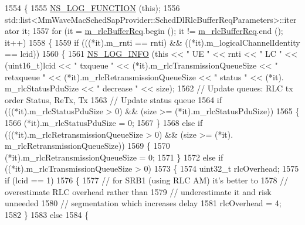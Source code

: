\begin{DoxyCode}
1554 \{
1555   \hyperlink{log-macros-disabled_8h_a90b90d5bad1f39cb1b64923ea94c0761}{NS\_LOG\_FUNCTION} (\textcolor{keyword}{this});
1556   std::list<MmWaveMacSchedSapProvider::SchedDlRlcBufferReqParameters>::iterator it;
1557   \textcolor{keywordflow}{for} (it = \hyperlink{classns3_1_1MmWaveFlexTtiMaxWeightMacScheduler_ad93ce7bf5f3377a1cfa4bc54b7e7b551}{m\_rlcBufferReq}.begin (); it != \hyperlink{classns3_1_1MmWaveFlexTtiMaxWeightMacScheduler_ad93ce7bf5f3377a1cfa4bc54b7e7b551}{m\_rlcBufferReq}.end (); it++)
1558     \{
1559       \textcolor{keywordflow}{if} (((*it).m\_rnti == rnti) && ((*it).m\_logicalChannelIdentity == lcid))
1560         \{
1561           \hyperlink{group__logging_gafbd73ee2cf9f26b319f49086d8e860fb}{NS\_LOG\_INFO} (\textcolor{keyword}{this} << \textcolor{stringliteral}{" UE "} << rnti << \textcolor{stringliteral}{" LC "} << (uint16\_t)lcid << \textcolor{stringliteral}{" txqueue "} << 
      (*it).m\_rlcTransmissionQueueSize << \textcolor{stringliteral}{" retxqueue "} << (*it).m\_rlcRetransmissionQueueSize << \textcolor{stringliteral}{" status "} << (*it).
      m\_rlcStatusPduSize << \textcolor{stringliteral}{" decrease "} << size);
1562           \textcolor{comment}{// Update queues: RLC tx order Status, ReTx, Tx}
1563           \textcolor{comment}{// Update status queue}
1564            \textcolor{keywordflow}{if} (((*it).m\_rlcStatusPduSize > 0) && (size >= (*it).m\_rlcStatusPduSize))
1565               \{
1566                 (*it).m\_rlcStatusPduSize = 0;
1567               \}
1568             \textcolor{keywordflow}{else} \textcolor{keywordflow}{if} (((*it).m\_rlcRetransmissionQueueSize > 0) && (size >= (*it).
      m\_rlcRetransmissionQueueSize))
1569               \{
1570                 (*it).m\_rlcRetransmissionQueueSize = 0;
1571               \}
1572             \textcolor{keywordflow}{else} \textcolor{keywordflow}{if} ((*it).m\_rlcTransmissionQueueSize > 0)
1573               \{
1574                 uint32\_t rlcOverhead;
1575                 \textcolor{keywordflow}{if} (lcid == 1)
1576                   \{
1577                     \textcolor{comment}{// for SRB1 (using RLC AM) it's better to}
1578                     \textcolor{comment}{// overestimate RLC overhead rather than}
1579                     \textcolor{comment}{// underestimate it and risk unneeded}
1580                     \textcolor{comment}{// segmentation which increases delay}
1581                     rlcOverhead = 4;
1582                   \}
1583                 \textcolor{keywordflow}{else}
1584                   \{

\end{DoxyCode}

